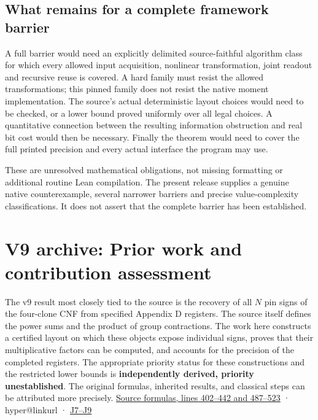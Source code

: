 \documentclass[
  11pt,
]{article}
\makeatletter
\newcommand{\PaperSixCatalogue}[1]{\csname hyper@linkurl\endcsname{#1}{EVIDENCE_CATALOG.md}}
\newcommand{\PaperSixEvidence}[2]{\PaperSixCatalogue{#2}}
\makeatother
\begin{document}
\subsection{What remains for a complete framework
barrier}\label{v9-what-remains-for-a-complete-framework-barrier}

A full barrier would need an explicitly delimited source-faithful
algorithm class for which every allowed input acquisition, nonlinear
transformation, joint readout and recursive reuse is covered. A hard
family must resist the allowed transformations; this pinned family does
not resist the native moment implementation. The source's actual
deterministic layout choices would need to be checked, or a lower bound
proved uniformly over all legal choices. A quantitative connection
between the resulting information obstruction and real bit cost would
then be necessary. Finally the theorem would need to cover the full
printed precision and every actual interface the program may use.

These are unresolved mathematical obligations, not missing formatting or
additional routine Lean compilation. The present release supplies a
genuine native counterexample, several narrower barriers and precise
value-complexity classifications. It does not assert that the complete
barrier has been established.

\section{V9 archive: Prior work and contribution assessment}\label{v9-section-contribution-audit}

The v9 result most closely tied to the source is the recovery of all
\(N\) pin signs of the four-clone CNF from specified Appendix D
registers. The source itself defines the power sums and the product of
group contractions. The work here constructs a certified layout on which
these objects expose individual signs, proves that their multiplicative
factors can be computed, and accounts for the precision of the completed
registers. The appropriate priority status for these constructions and
the restricted lower bounds is \textbf{independently derived, priority
unestablished}. The original formulas, inherited results, and classical
steps can be attributed more precisely.
\href{https://github.com/openai/math/blob/main/preprints/The-Exponential-Time-Hypothesis-is-False-October-25-2026/build/quantitative-contraction.tex\#L402}{Source
formulas, lines 402--442 and 487--523} ·
\PaperSixEvidence{evidence/research_v7/reviews/hybrid_independent.md}{v7 pinned family}
· \hyperref[v9-section-moment-escape]{J7--J9}
\end{document}

